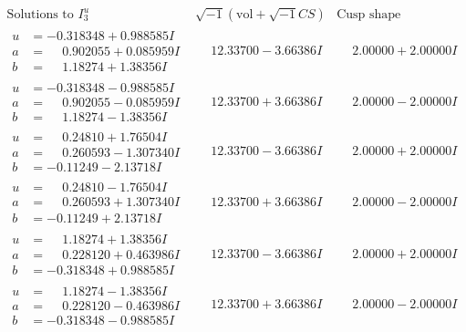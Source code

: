 \documentclass[1p]{elsarticle_modified}
\theoremstyle{definition}
\newcommand{\I}{\sqrt{-1}}
\begin{document}
$$\begin{array}{c|c|c}  
\text{Solutions to }I^u_{3}& \I (\text{vol} + \sqrt{-1}CS) & \text{Cusp shape}\\
 \hline 
\begin{aligned}
u &= -0.318348 + 0.988585 I \\
a &= \phantom{-}0.902055 + 0.085959 I \\
b &= \phantom{-}1.18274 + 1.38356 I\end{aligned}
 & \phantom{-}12.33700 - 3.66386 I & \phantom{-}2.00000 + 2.00000 I \\ \hline\begin{aligned}
u &= -0.318348 - 0.988585 I \\
a &= \phantom{-}0.902055 - 0.085959 I \\
b &= \phantom{-}1.18274 - 1.38356 I\end{aligned}
 & \phantom{-}12.33700 + 3.66386 I & \phantom{-}2.00000 - 2.00000 I \\ \hline\begin{aligned}
u &= \phantom{-}0.24810 + 1.76504 I \\
a &= \phantom{-}0.260593 - 1.307340 I \\
b &= -0.11249 - 2.13718 I\end{aligned}
 & \phantom{-}12.33700 - 3.66386 I & \phantom{-}2.00000 + 2.00000 I \\ \hline\begin{aligned}
u &= \phantom{-}0.24810 - 1.76504 I \\
a &= \phantom{-}0.260593 + 1.307340 I \\
b &= -0.11249 + 2.13718 I\end{aligned}
 & \phantom{-}12.33700 + 3.66386 I & \phantom{-}2.00000 - 2.00000 I \\ \hline\begin{aligned}
u &= \phantom{-}1.18274 + 1.38356 I \\
a &= \phantom{-}0.228120 + 0.463986 I \\
b &= -0.318348 + 0.988585 I\end{aligned}
 & \phantom{-}12.33700 - 3.66386 I & \phantom{-}2.00000 + 2.00000 I \\ \hline\begin{aligned}
u &= \phantom{-}1.18274 - 1.38356 I \\
a &= \phantom{-}0.228120 - 0.463986 I \\
b &= -0.318348 - 0.988585 I\end{aligned}
 & \phantom{-}12.33700 + 3.66386 I & \phantom{-}2.00000 - 2.00000 I \\ \hline\begin{aligned}

\end{aligned}
\end{array}$$
\end{document}
